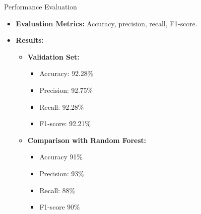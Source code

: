 \documentclass{beamer}
\begin{document}
\begin{frame}{Performance Evaluation}
  \begin{itemize}
    \item \textbf{Evaluation Metrics:} Accuracy, precision, recall, F1-score.
    \item \textbf{Results:}
      \begin{itemize}
        \item \textbf{Validation Set:}
          \begin{itemize}
            \item Accuracy: 92.28\%
            \item Precision: 92.75\%
            \item Recall: 92.28\%
            \item F1-score: 92.21\%
          \end{itemize}
        \item \textbf{Comparison with Random Forest:}
          \begin{itemize}
            \item Accuracy 91\%
            \item Precision: 93\%
            \item Recall: 88\%
            \item F1-score 90\%
          \end{itemize}
      \end{itemize}
  \end{itemize}
\end{frame}
\end{document}
